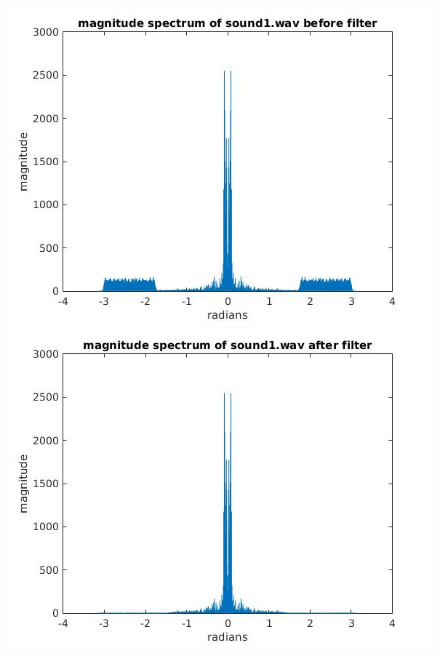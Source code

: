 \documentclass{article}
\begin{document}
\begin{figure}[H]
\includegraphics[scale = .5]{report6_1}
\includegraphics[scale = .5]{report6_3}
\end{figure}

\begin{figure}[H]

\end{figure}
\end{document}
